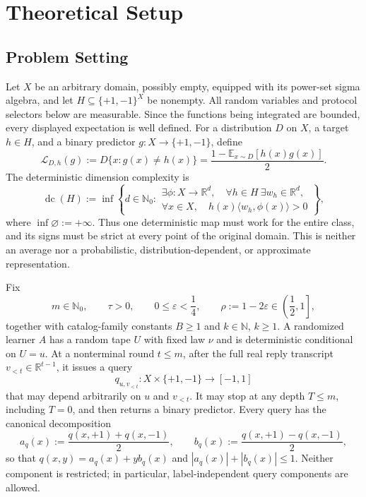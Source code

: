 \section{Theoretical Setup}\label{sec:setup}

\subsection{Problem Setting}

Let $X$ be an arbitrary domain, possibly empty, equipped with its power-set
sigma algebra, and let $H\subseteq\{+1,-1\}^{X}$ be nonempty.  All random
variables and protocol selectors below are measurable.  Since the functions
being integrated are bounded, every displayed expectation is well defined.
For a distribution $D$ on $X$, a target $h\in H$, and a binary predictor
$g:X\to\{+1,-1\}$, define
\begin{equation}\label{eq:loss-definition}
\mathcal L_{D,h}(g)
:=D\{x:g(x)\ne h(x)\}
=\frac{1-\mathbb E_{x\sim D}[h(x)g(x)]}{2}.
\end{equation}
The deterministic dimension complexity is
\begin{equation}\label{eq:dc-definition}
\operatorname{dc}(H):=
\inf\left\{d\in\mathbb N_0:
\begin{array}{l}
\exists\phi:X\to\mathbb R^d,\quad
\forall h\in H\ \exists w_h\in\mathbb R^d,\\[-1mm]
\forall x\in X,\quad h(x)\langle w_h,\phi(x)\rangle>0
\end{array}\right\},
\end{equation}
where $\inf\varnothing:=+\infty$.  Thus one deterministic map must work for
the entire class, and its signs must be strict at every point of the original
domain.  This is neither an average nor a probabilistic,
distribution-dependent, or approximate representation.

Fix
\[
m\in\mathbb N_0,\qquad \tau>0,\qquad
0\le\varepsilon<\frac14,\qquad
\rho:=1-2\varepsilon\in\left(\frac12,1\right],
\]
together with catalog-family constants $B\ge1$ and
$k\in\mathbb N$, $k\ge1$.  A randomized learner $A$ has a random tape
$U$ with fixed law $\nu$ and is deterministic conditional on $U=u$.  At a
nonterminal round $t\le m$, after the full real reply transcript
$v_{<t}\in\mathbb R^{t-1}$, it issues a query
\[
q_{u,v_{<t}}:X\times\{+1,-1\}\longrightarrow[-1,1]
\]
that may depend arbitrarily on $u$ and $v_{<t}$.  It may stop at any depth
$T\le m$, including $T=0$, and then returns a binary predictor.  Every query
has the canonical decomposition
\[
a_q(x):=\frac{q(x,+1)+q(x,-1)}2,\qquad
b_q(x):=\frac{q(x,+1)-q(x,-1)}2,
\]
so that $q(x,y)=a_q(x)+yb_q(x)$ and
$|a_q(x)|+|b_q(x)|\le1$.  Neither component is restricted; in particular,
label-independent query components are allowed.

